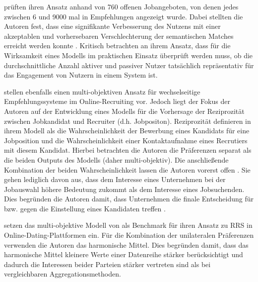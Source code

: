 \textcite[S. 15f.]{rodriguez:inproceedings} prüften ihren Ansatz anhand von 760 offenen Jobangeboten, von denen jedes zwischen 6 und 9000 mal in Empfehlungen angezeigt wurde.
Dabei stellten die Autoren fest, dass eine signifikante Verbesserung des Nutzens mit einer akzeptablen und vorhersebaren Verschlechterung der semantischen Matches erreicht werden konnte \cite[S. 11]{rodriguez:inproceedings}.
Kritisch betrachten \textcite[S. 16]{rodriguez:inproceedings} an ihrem Ansatz, dass für die Wirksamkeit eines Modells im praktischen Einsatz überprüft werden muss, ob die durchschnittliche Anzahl aktiver und passiver Nutzer tatsächlich repräsentativ für das Engagement von Nutzern in einem System ist.

\textcite[S. 1467ff.]{yildirim:article} stellen ebenfalls einen multi-objektiven Ansatz für wechselseitige Empfehlungssysteme im Online-Recruiting vor.
Jedoch liegt der Fokus der Autoren auf der Entwicklung eines Modells für die Vorhersage der Reziprozität zwischen Jobkandidat und Recruiter (d.h. Jobpositon).
Reziprozität definieren \textcite[S. 1470]{yildirim:article} in ihrem Modell als die Wahrscheinlichkeit der Bewerbung eines Kandidats für eine Jobposition und die Wahrscheinlichkeit einer Kontaktaufnahme eines Recrutiers mit diesem Kandidat.
Hierbei betrachten die Autoren die Präferenzen separat als die beiden Outputs des Modells (daher multi-objektiv).
Die anschließende Kombination der beiden Wahrscheinlichkeit lassen die Autoren vorerst offen \cite[S. 1474]{yildirim:article}.
Sie gehen lediglich davon aus, dass dem Interesse eines Unternehmen bei der Jobauswahl höhere Bedeutung zukommt als dem Interesse eines Jobsuchenden.
Dies begründen die Autoren damit, dass Unternehmen die finale Entscheidung für bzw. gegen die Einstellung eines Kandidaten treffen \cite[S. 1470]{yildirim:article}.

\textcite[S. 705ff.]{kumari:article} setzen das multi-objektive Modell von \textcite[S. 1467ff.]{yildirim:article} als Benchmark für ihren Ansatz zu \ac{RRS} in Online-Dating-Plattformen ein.
Für die Kombination der unilateralen Präferenzen verwenden die Autoren das harmonische Mittel.
Dies begründen \textcite[S. 724]{kumari:article} damit, dass das harmonische Mittel kleinere Werte einer Datenreihe stärker berücksichtigt und dadurch die Interessen beider Parteien stärker vertreten sind als bei vergleichbaren Aggregationsmethoden.

